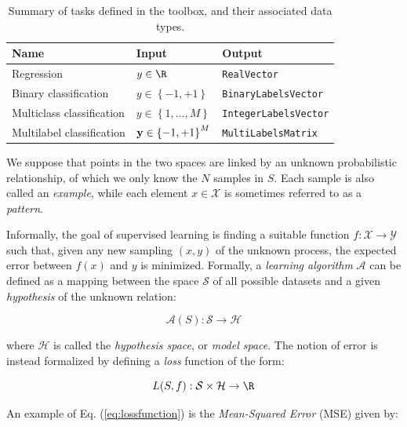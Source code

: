 \begin{center}
\begin{table}[t]
{\centering\hfill{}
\begin{tabular}{lll}
\toprule
Name & Input & Output \\ 
\midrule
Regression & $y \in \R$ & \verb|RealVector| \\
Binary classification & $y \in \left\{-1,+1\right\}$ & \verb|BinaryLabelsVector| \\
Multiclass classification & $y \in \left\{1,\dots,M\right\}$ & \verb|IntegerLabelsVector| \\
Multilabel classification & $\mathbf{y} \in \left\{-1,+1\right\}^M$ & \verb|MultiLabelsMatrix| \\
\bottomrule
\end{tabular}}
\hfill{}
\caption{Summary of tasks defined in the toolbox, and their associated data types.}
\label{tab:basictasks}
\end{table}
\end{center}

We suppose that points in the two spaces are linked by an unknown probabilistic relationship, of which we only know the $N$ samples in $S$. Each sample is also called an \textit{example}, while each element $x \in \mathcal{X}$ is sometimes referred to as a \textit{pattern}.

Informally, the goal of supervised learning is finding a suitable function $f: \mathcal{X} \rightarrow \mathcal{Y}$ such that, given any new sampling $(x, y)$ of the unknown process, the expected error between $f(x)$ and $y$ is minimized. Formally, a \textit{learning algorithm} $\mathcal{A}$ can be defined as a mapping between the space $\mathcal{S}$ of all possible datasets and a given \textit{hypothesis} of the unknown relation:

\begin{equation}
\mathcal{A}(S) : \mathcal{S} \rightarrow \mathcal{H}
\label{eq:learningalgorithm}
\end{equation}

\noindent where $\mathcal{H}$ is called the \textit{hypothesis space}, or \textit{model space}. The notion of error is instead formalized by defining a \textit{loss} function of the form:

\begin{equation}
L(S, f) :  \mathcal{S} \times \mathcal{H} \rightarrow \R
\label{eq:lossfunction}
\end{equation}

\noindent An example of Eq. (\ref{eq:lossfunction}) is the \textit{Mean-Squared Error} (MSE) given by:

